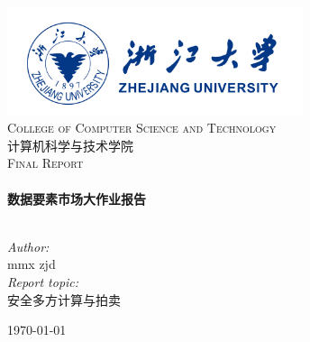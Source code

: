 \begin{titlepage}

\begin{center}


\includegraphics[width=0.65\textwidth]{figure/zju_logo}\\[1cm]    

\textsc{\LARGE College of Computer Science and Technology}\\[0.5cm]
\textsc{ \heiti 计算机科学与技术学院}\\[1.5cm]

\textsc{\Large Final Report}\\[0.5cm]


\HRule \\[0.4cm]
{ \huge \bfseries 数据要素市场大作业报告
}

\HRule \\[1.5cm]

\large \emph{Author:}\\
\kaishu mmx zjd\\
\large \emph{Report topic:} \\
\kaishu 安全多方计算与拍卖

\vfill

{\large \today}

\end{center}

\end{titlepage}
